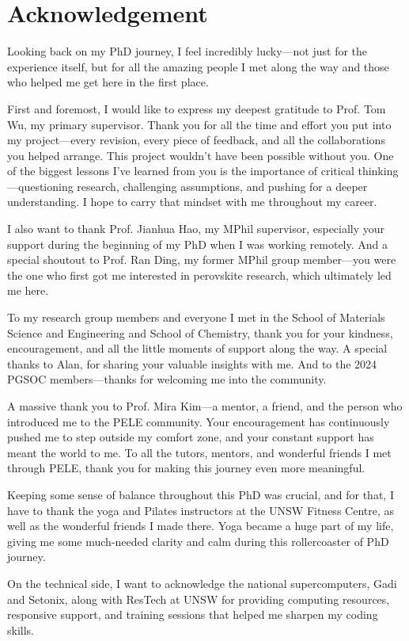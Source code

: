 \chapter{Acknowledgement}

Looking back on my PhD journey, I feel incredibly lucky—not just for the experience itself, but for all the amazing people I met along the way and those who helped me get here in the first place.

First and foremost, I would like to express my deepest gratitude to Prof. Tom Wu, my primary supervisor. Thank you for all the time and effort you put into my project—every revision, every piece of feedback, and all the collaborations you helped arrange. This project wouldn’t have been possible without you. One of the biggest lessons I’ve learned from you is the importance of critical thinking—questioning research, challenging assumptions, and pushing for a deeper understanding. I hope to carry that mindset with me throughout my career.

I also want to thank Prof. Jianhua Hao, my MPhil supervisor, especially your support during the beginning of my PhD when I was working remotely. And a special shoutout to Prof. Ran Ding, my former MPhil group member—you were the one who first got me interested in perovskite research, which ultimately led me here.

To my research group members and everyone I met in the School of Materials Science and Engineering and School of Chemistry, thank you for your kindness, encouragement, and all the little moments of support along the way. A special thanks to Alan, for sharing your valuable insights with me. And to the 2024 PGSOC members—thanks for welcoming me into the community.

A massive thank you to Prof. Mira Kim—a mentor, a friend, and the person who introduced me to the PELE community. Your encouragement has continuously pushed me to step outside my comfort zone, and your constant support has meant the world to me. To all the tutors, mentors, and wonderful friends I met through PELE, thank you for making this journey even more meaningful.

Keeping some sense of balance throughout this PhD was crucial, and for that, I have to thank the yoga and Pilates instructors at the UNSW Fitness Centre, as well as the wonderful friends I made there. Yoga became a huge part of my life, giving me some much-needed clarity and calm during this rollercoaster of PhD journey.

On the technical side, I want to acknowledge the national supercomputers, Gadi and Setonix, along with ResTech at UNSW for providing computing resources, responsive support, and training sessions that helped me sharpen my coding skills.

